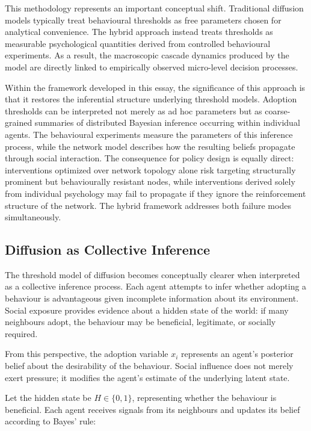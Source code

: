 \documentclass[12pt,a4paper]{article}
\theoremstyle{plain}
\theoremstyle{definition}
\begin{document}
This methodology represents an important conceptual shift. Traditional diffusion models typically treat behavioural thresholds as free parameters chosen for analytical convenience. The hybrid approach instead treats thresholds as measurable psychological quantities derived from controlled behavioural experiments. As a result, the macroscopic cascade dynamics produced by the model are directly linked to empirically observed micro-level decision processes.

Within the framework developed in this essay, the significance of this approach is that it restores the inferential structure underlying threshold models. Adoption thresholds can be interpreted not merely as ad hoc parameters but as coarse-grained summaries of distributed Bayesian inference occurring within individual agents. The behavioural experiments measure the parameters of this inference process, while the network model describes how the resulting beliefs propagate through social interaction. The consequence for policy design is equally direct: interventions optimized over network topology alone risk targeting structurally prominent but behaviourally resistant nodes, while interventions derived solely from individual psychology may fail to propagate if they ignore the reinforcement structure of the network. The hybrid framework addresses both failure modes simultaneously.

\subsection{Diffusion as Collective Inference}

The threshold model of diffusion becomes conceptually clearer when interpreted as a collective inference process. Each agent attempts to infer whether adopting a behaviour is advantageous given incomplete information about its environment. Social exposure provides evidence about a hidden state of the world: if many neighbours adopt, the behaviour may be beneficial, legitimate, or socially required.

From this perspective, the adoption variable $x_i$ represents an agent's posterior belief about the desirability of the behaviour. Social influence does not merely exert pressure; it modifies the agent's estimate of the underlying latent state.

Let the hidden state be $H \in \{0,1\}$, representing whether the behaviour is beneficial. Each agent receives signals from its neighbours and updates its belief according to Bayes' rule:
\end{document}
